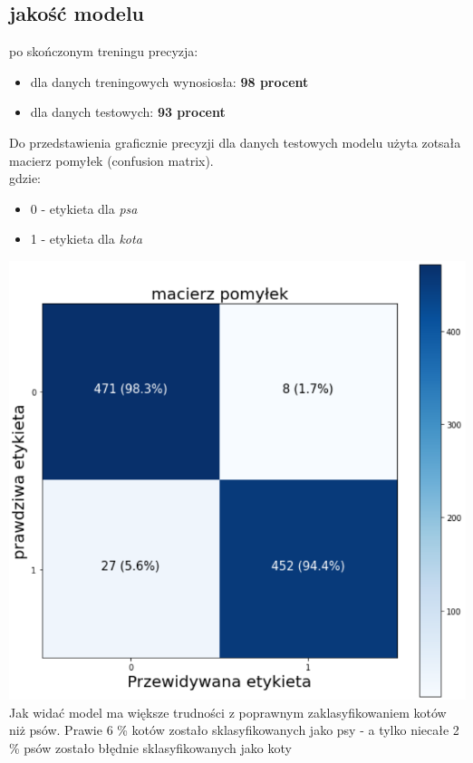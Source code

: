 \documentclass[a4paper,12pt]{scrartcl}
\begin{document}
\subsection{jakość modelu}

po skończonym treningu precyzja:
\begin{itemize}
  \item dla danych treningowych wynosiosła: \textbf{98 procent}
  \item dla danych testowych: \textbf{93 procent}
\end{itemize}

Do przedstawienia graficznie precyzji dla danych testowych
modelu  użyta zotsała macierz pomyłek (confusion matrix).\\
gdzie:
\begin{itemize}
  \item 0 - etykieta dla \textit{psa}
  \item 1 - etykieta dla \textit{kota}
\end{itemize}
\includegraphics[scale=0.5]{conf.png}\\
Jak widać model ma większe trudności z poprawnym zaklasyfikowaniem kotów niż psów.
Prawie 6 \%  kotów zostało sklasyfikowanych jako psy - a tylko niecałe 2 \% psów zostało błędnie sklasyfikowanych jako koty  
\end{document}
